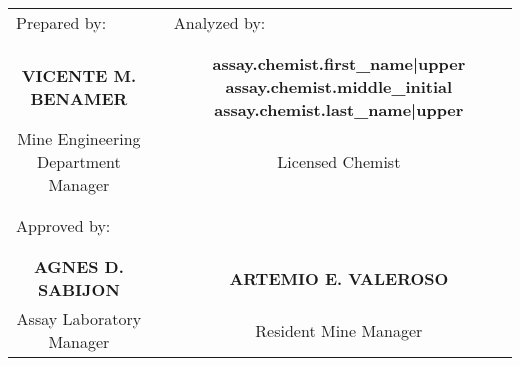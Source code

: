 \documentclass[10pt]{article}
\begin{document}
\begin{tabularx}{0.95\linewidth}{@{}cXc@{}}
    \multicolumn{1}{l}{Prepared by:}
        && \multicolumn{1}{l}{Analyzed by:} \\
    && \\ && \\
    \bfseries VICENTE M. BENAMER
        && \bfseries {{ assay.chemist.first_name|upper }} {{ assay.chemist.middle_initial }} {{ assay.chemist.last_name|upper }} \\
    Mine Engineering Department Manager
        && Licensed Chemist \\
    && \\ && \\
    \multicolumn{3}{l}{Approved by:} \\
    && \\ && \\
    \bfseries AGNES D. SABIJON
        && \bfseries ARTEMIO E. VALEROSO \\
    Assay Laboratory Manager
        && Resident Mine Manager \\
\end{tabularx}
\end{document}
